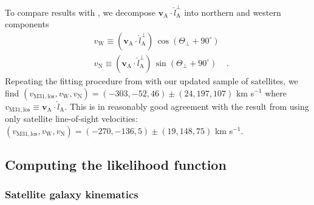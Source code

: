 \documentclass[preprint]{aastex}
\begin{document}
To compare results with \citet{vdm}, we decompose
$\mathbf{v}_{\mathrm{A}} \cdot \hat{l}_\mathrm{A}^\perp$ into northern and
western components
\begin{eqnarray}
    & v_\mathrm{W} \equiv
    (\mathbf{v}_{\mathrm{A}} \cdot \hat{l}_\mathrm{A}^\perp)
        \, \cos \left ( \Theta_\perp + 90^\circ \right ) & \nonumber \\
    & v_\mathrm{N} \equiv
    (\mathbf{v}_{\mathrm{A}} \cdot \hat{l}_\mathrm{A}^\perp)
        \, \sin \left ( \Theta_\perp + 90^\circ \right ) & .
\end{eqnarray}
Repeating the fitting procedure from \citet{vdm} with our updated sample of
satellites, we find
$(v_\mathrm{M31,los}, v_\mathrm{W}, v_\mathrm{N}) = (-303, -52, 46) \pm (24, 197, 107)$
km s$^{-1}$ where
$v_\mathrm{M31,los} \equiv \mathbf{v}_{\mathrm{A}} \cdot \hat{l}_\mathrm{A}$.
This is in reasonably good agreement with the result from \citet{vdm} using only
satellite line-of-sight velocities:
$(v_\mathrm{M31,los}, v_\mathrm{W}, v_\mathrm{N}) = (-270, -136, 5) \pm (19, 148, 75)$
km s$^{-1}$.

\subsection{Computing the likelihood function}

\subsubsection{Satellite galaxy kinematics}
\end{document}
